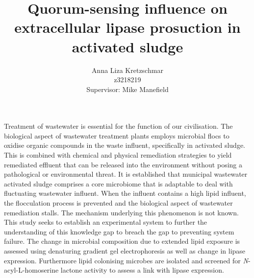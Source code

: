 \documentclass[11pt]{article}
\title{\textbf{Quorum-sensing influence on extracellular lipase prosuction in activated sludge}}
\author{Anna Liza Kretzschmar\\
        z3218219\\
        Supervisor: Mike Manefield}
\date{}
\begin{document}
Treatment of wastewater is essential for the function of our civilisation. The biological aspect of wastewater treatment plants employs microbial flocs to oxidise organic compounds in the waste influent, specifically in activated sludge. This is combined with chemical and physical remediation strategies to yield remediated effluent that can be released into the environment without posing a pathological or environmental threat. 
It is established that municipal wastewater activated sludge comprises a core microbiome that is adaptable to deal with fluctuating wastewater influent. When the influent contains a high lipid influent, the flocculation process is prevented and the biological aspect of wastewater remediation stalls. The mechanism underlying this phenomenon is not known. This study seeks to establish an experimental system to further the understanding of this knowledge gap to breach the gap to preventing system failure.
The change in microbial composition due to extended lipid exposure is assessed using denaturing gradient gel electrophoresis as well as change in lipase expression. Furthermore lipid colonising microbes are isolated and screened for \emph{N}-acyl-L-homoserine lactone activity to assess a link with lipase expression. 
\end{document}
